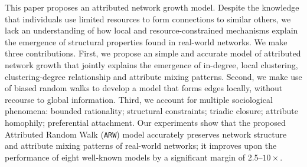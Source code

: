 
This paper proposes an attributed network growth model. Despite the knowledge
that individuals use limited resources to form connections to similar others, we
lack an understanding of how local and resource-constrained mechanisms explain
the emergence of structural properties found in real-world networks. We
make three contributions. First, we propose an simple and accurate model
of attributed network growth that jointly explains the emergence of in-degree, local clustering, clustering-degree relationship and attribute
mixing patterns. Second, we make use of biased random walks to develop a model
that forms edges locally, without recourse to global information. Third, we
account for multiple sociological phenomena: bounded rationality; structural
constraints; triadic closure; attribute homophily; preferential attachment.
Our experiments show that the proposed Attributed Random Walk (\texttt{ARW}) model
accurately preserves network structure and attribute mixing patterns of
real-world networks; it improves upon the performance of eight
well-known models by a significant margin of
2.5--$10\times$.
